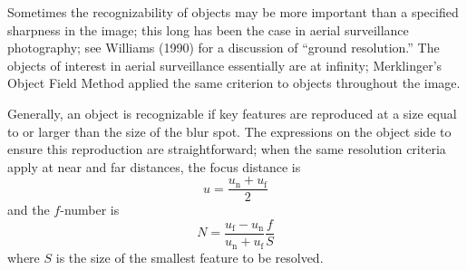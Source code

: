 \documentclass[11pt, oneside]{scrartcl}   	%
\begin{document}
Sometimes the recognizability of objects may be more important than a specified sharpness in the image; this long has been the case in aerial surveillance photography; see Williams (1990) for a discussion of “ground resolution.” The objects of interest in aerial surveillance essentially are at infinity; Merklinger’s Object Field Method applied the same criterion to objects throughout the image.

Generally, an object is recognizable if key features are reproduced at a size equal to or larger than the size of the blur spot. The expressions on the object side to ensure this reproduction are straightforward; when the same resolution criteria apply at near and far distances, the focus distance is
\begin{equation}
   u=\frac{u_\mathrm{n}+u_\mathrm{f}}2
   \label{eq:65}
\end{equation}
and the $f$-number is
\begin{equation}
   N = \frac{u_\mathrm{f} - u_\mathrm{n}}{u_\mathrm{n}+u_\mathrm{f}}\frac f S
   \label{eq:66}
\end{equation}
where $S$ is the size of the smallest feature to be resolved.
\end{document}
